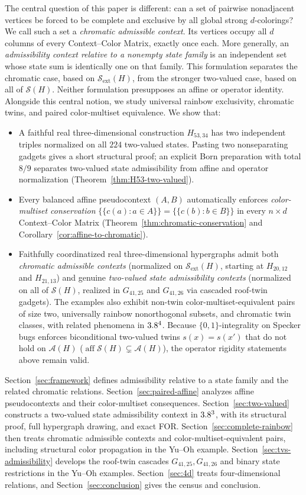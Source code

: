 \documentclass[aps,pra,reprint,superscriptaddress,longbibliography,nofootinbib,floatfix,10pt]{revtex4-2}
\theoremstyle{definition}\newtheorem{definition}[theorem]{Definition}
\theoremstyle{remark}\newtheorem{remark}[theorem]{Remark}
\newcommand{\Sc}{\mathcal S}\newcommand{\Cc}{\mathcal C}\newcommand{\Wc}{\mathcal W}
\begin{document}
The central question of this paper is different: can a set of pairwise nonadjacent vertices be forced to be complete and exclusive by all global strong $d$-colorings? We call such a set a \emph{chromatic admissible context}. Its vertices occupy all $d$ columns of every Context--Color Matrix, exactly once each. More generally, an \emph{admissibility context relative to a nonempty state family} is an independent set whose state sum is identically one on that family. This formulation separates the chromatic case, based on $\Sc_{\mathrm{ext}}(H)$, from the stronger two-valued case, based on all of $\Sc(H)$. Neither formulation presupposes an affine or operator identity. Alongside this central notion, we study universal rainbow exclusivity, chromatic twins, and paired color-multiset equivalence. We show that:
\begin{itemize}
\item A faithful real three-dimensional construction $H_{53,34}$ has two independent triples normalized on all $224$ two-valued states. Pasting two nonseparating gadgets gives a short structural proof; an explicit Born preparation with total $8/9$ separates two-valued state admissibility from affine and operator normalization (Theorem~\ref{thm:H53-two-valued}).
\item Every balanced affine pseudocontext $(A,B)$ automatically enforces \emph{color-multiset conservation} $\{\!\{c(a):a\in A\}\!\}=\{\!\{c(b):b\in B\}\!\}$ in every $n\times d$ Context--Color Matrix (Theorem~\ref{thm:chromatic-conservation} and Corollary~\ref{cor:affine-to-chromatic}).
\item Faithfully coordinatized real three-dimensional hypergraphs admit both \emph{chromatic admissible contexts} (normalized on $\Sc_{\mathrm{ext}}(H)$, starting at $H_{20,12}$ and $H_{21,13}$) and genuine \emph{two-valued state admissibility contexts} (normalized on all of $\Sc(H)$, realized in $G_{41,25}$ and $G_{41,26}$ via cascaded roof-twin gadgets). The examples also exhibit non-twin color-multiset-equivalent pairs of size two, universally rainbow nonorthogonal subsets, and chromatic twin classes, with related phenomena in $3.8^4$. Because $\{0,1\}$-integrality on Specker bugs enforces biconditional two-valued twins $s(x)=s(x')$ that do not hold on $\mathcal A(H)$ ($\operatorname{aff}\Sc(H)\subsetneq\mathcal A(H)$), the operator rigidity statements above remain valid.
\end{itemize}

Section~\ref{sec:framework} defines admissibility relative to a state family and the related chromatic relations. Section~\ref{sec:paired-affine} analyzes affine pseudocontexts and their color-multiset consequences. Section~\ref{sec:two-valued} constructs a two-valued state admissibility context in $3.8^3$, with its structural proof, full hypergraph drawing, and exact FOR. Section~\ref{sec:complete-rainbow} then treats chromatic admissible contexts and color-multiset-equivalent pairs, including structural color propagation in the Yu--Oh example. Section~\ref{sec:tvs-admissibility} develops the roof-twin cascades $G_{41,25},G_{41,26}$ and binary state restrictions in the Yu--Oh examples. Section~\ref{sec:4d} treats four-dimensional relations, and Section~\ref{sec:conclusion} gives the census and conclusion.
\end{document}
